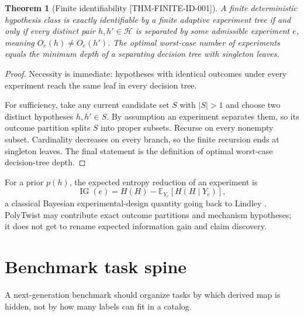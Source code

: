 \documentclass[11pt,openany]{book}
\newcommand{\claimid}[1]{\textnormal{\sffamily\footnotesize[#1]}}
\theoremstyle{polyplain}
\newtheorem{theorem}{Theorem}[chapter]
\theoremstyle{polydef}
\begin{document}
\begin{theorem}[Finite identifiability \claimid{THM-FINITE-ID-001}]
\label{thm:finite-identifiability}
A finite deterministic hypothesis class is exactly identifiable by a finite adaptive experiment tree if and only if every distinct pair $h,h'\in\mathcal H$ is separated by some admissible experiment $e$, meaning $O_e(h)\ne O_e(h')$. The optimal worst-case number of experiments equals the minimum depth of a separating decision tree with singleton leaves.
\end{theorem}

\begin{proof}
Necessity is immediate: hypotheses with identical outcomes under every experiment reach the same leaf in every decision tree.

For sufficiency, take any current candidate set $S$ with $|S|>1$ and choose two distinct hypotheses $h,h'\in S$. By assumption an experiment separates them, so its outcome partition splits $S$ into proper subsets. Recurse on every nonempty subset. Cardinality decreases on every branch, so the finite recursion ends at singleton leaves. The final statement is the definition of optimal worst-case decision-tree depth.
\end{proof}

For a prior $p(h)$, the expected entropy reduction of an experiment is
\[
\operatorname{IG}(e)=H(H)-\mathbb E_{Y_e}[H(H\mid Y_e)],
\]
a classical Bayesian experimental-design quantity going back to Lindley \parencite{Lindley1956}. PolyTwist may contribute exact outcome partitions and mechanism hypotheses; it does not get to rename expected information gain and claim discovery.

\section{Benchmark task spine}

A next-generation benchmark should organize tasks by which derived map is hidden, not by how many labels can fit in a catalog.
\end{document}
